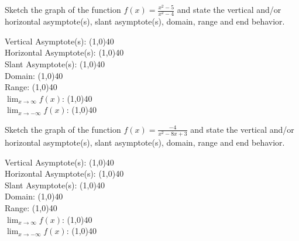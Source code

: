\documentclass[../main.tex]{subfiles}
\begin{document}
\begin{questions}
    \newpage
    \question[1] Sketch the graph of the function $f(x) = \frac{x^2 - 5}{x^2 - 4}$ and state the vertical and/or horizontal asymptote(s), slant asymptote(s), domain, range and end behavior.
    
        \begin{left} 
        \end{left}
    
    Vertical Asymptote(s): \line(1,0){40} \\
    \newline
    Horizontal Asymptote(s): \line(1,0){40} \\
    \newline
    Slant Asymptote(s): \line(1,0){40} \\
    \newline
    Domain: \line(1,0){40} \\
    \newline
    Range: \line(1,0){40} \\
    \newline
    $\lim_{x\to\infty} f(x)$: \line(1,0){40} \\
    \newline
    $\lim_{x\to-\infty} f(x)$: \line(1,0){40} \\
    
    \question[1] Sketch the graph of the function $f(x) = \frac{-4}{x^2-8x+3}$ and state the vertical and/or horizontal asymptote(s), slant asymptote(s), domain, range and end behavior.
    
        \begin{left} 
        \end{left}
    
    Vertical Asymptote(s): \line(1,0){40} \\
    \newline
    Horizontal Asymptote(s): \line(1,0){40} \\
    \newline
    Slant Asymptote(s): \line(1,0){40} \\
    \newline
    Domain: \line(1,0){40} \\
    \newline
    Range: \line(1,0){40} \\
    \newline
    $\lim_{x\to\infty} f(x)$: \line(1,0){40} \\
    \newline
    $\lim_{x\to-\infty} f(x)$: \line(1,0){40} \\
    

\end{questions}
\end{document}
